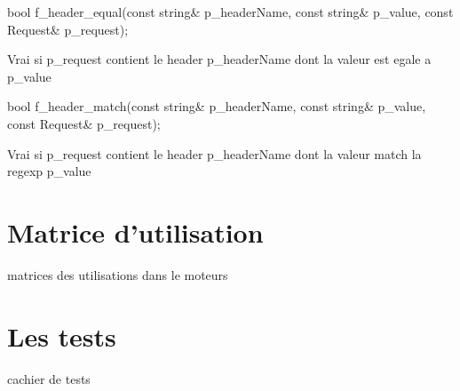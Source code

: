 \begin{DoxyItemize}
\item 
\begin{DoxyCode}
\textcolor{keywordtype}{bool} f\_header\_equal(\textcolor{keyword}{const} \textcolor{keywordtype}{string}& p\_headerName, \textcolor{keyword}{const} \textcolor{keywordtype}{string}& p\_value, \textcolor{keyword}{const} Request& p\_request); 
\end{DoxyCode}
 \par
\par
 Vrai si p\-\_\-request contient le header p\-\_\-header\-Name dont la valeur est egale a p\-\_\-value \par
\par

\item 
\begin{DoxyCode}
\textcolor{keywordtype}{bool} f\_header\_match(\textcolor{keyword}{const} \textcolor{keywordtype}{string}& p\_headerName, \textcolor{keyword}{const} \textcolor{keywordtype}{string}& p\_value, \textcolor{keyword}{const} Request& p\_request); 
\end{DoxyCode}
 \par
\par
 Vrai si p\-\_\-request contient le header p\-\_\-header\-Name dont la valeur match la regexp p\-\_\-value \par
\par

\end{DoxyItemize}



 \hypertarget{index_sec_usages}{}\section{Matrice d'utilisation}\label{index_sec_usages}





\begin{DoxyItemize}
\item matrices des utilisations dans le moteurs  
\end{DoxyItemize}



 \hypertarget{index_sec_tests}{}\section{Les tests}\label{index_sec_tests}





\begin{DoxyItemize}
\item cachier de tests  
\end{DoxyItemize}